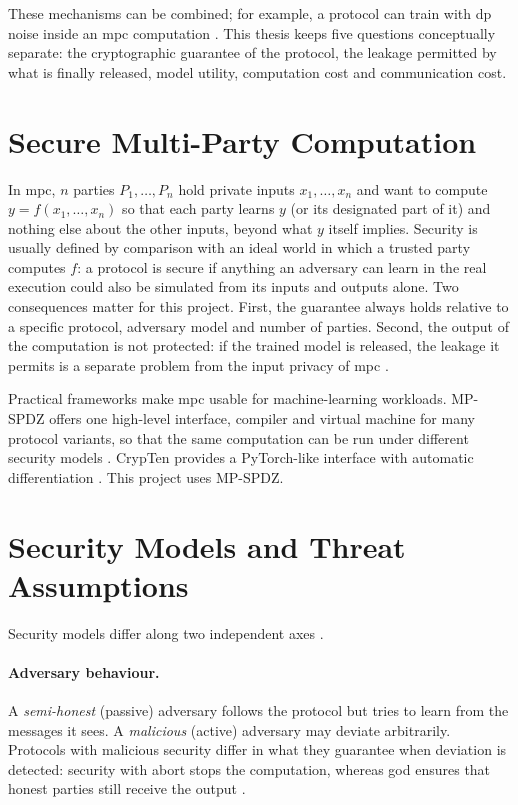 These mechanisms can be combined; for example, a protocol can train with \ac{dp} noise inside an \ac{mpc} computation \cite{das2025dpmpc}. This thesis keeps five questions conceptually separate: the cryptographic guarantee of the protocol, the leakage permitted by what is finally released, model utility, computation cost and communication cost.

\section{Secure Multi-Party Computation}\label{sec:bg-mpc}
In \ac{mpc}, $n$ parties $P_1,\dots,P_n$ hold private inputs $x_1,\dots,x_n$ and want to compute $y=f(x_1,\dots,x_n)$ so that each party learns $y$ (or its designated part of it) and nothing else about the other inputs, beyond what $y$ itself implies. Security is usually defined by comparison with an ideal world in which a trusted party computes $f$: a protocol is secure if anything an adversary can learn in the real execution could also be simulated from its inputs and outputs alone. Two consequences matter for this project. First, the guarantee always holds relative to a specific protocol, adversary model and number of parties. Second, the output of the computation is not protected: if the trained model is released, the leakage it permits is a separate problem from the input privacy of \ac{mpc} \cite{wagh2021falcon}.

Practical frameworks make \ac{mpc} usable for machine-learning workloads. MP-SPDZ offers one high-level interface, compiler and virtual machine for many protocol variants, so that the same computation can be run under different security models \cite{keller2020mpspdz}. CrypTen provides a PyTorch-like interface with automatic differentiation \cite{knott2021crypten}. This project uses MP-SPDZ.

\section{Security Models and Threat Assumptions}\label{sec:bg-security}
Security models differ along two independent axes \cite{keller2020mpspdz,zhou2024smpc}.

\paragraph{Adversary behaviour.} A \emph{semi-honest} (passive) adversary follows the protocol but tries to learn from the messages it sees. A \emph{malicious} (active) adversary may deviate arbitrarily. Protocols with malicious security differ in what they guarantee when deviation is detected: security with abort stops the computation, whereas \ac{god} ensures that honest parties still receive the output \cite{koti2021swift}.

